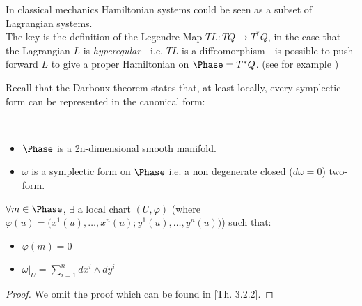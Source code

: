 \documentclass[Main]{subfiles}
\begin{document}
	\begin{observation}
		In classical mechanics Hamiltonian systems could be seen as a subset of Lagrangian systems.
		\\
		The key is the definition of the Legendre Map $TL: TQ \rightarrow T^*Q$,  in the case that the Lagrangian $L$  is \emph{hyperegular}  - i.e. $TL$ is a diffeomorphism - is possible to push-forward $L$ to give a proper Hamiltonian on $\Phase=T^*Q$. (see for example \cite{Abraham1978})
	\end{observation}	
	Recall that the Darboux theorem states that, at least locally, every symplectic form can be represented in the canonical form:
	\begin{theorem}[Darboux]
		$ $
		\begin{hypothesis}
			\begin{itemize}
				\item $\Phase$ is a 2n-dimensional smooth manifold.
				\item $\omega$ is a symplectic form on $\Phase$ i.e. a non degenerate closed ($d \omega =0$) two-form.
			\end{itemize}
		\end{hypothesis}
		\begin{thesis}
			 $\forall m\in \Phase$,  $\exists$ a local chart  $(U,\varphi)$ (where $\varphi(u) = \big(x^1(u), \ldots, x^n(u); y^1(u),\ldots, y^n(u) \big)$) such that:
					\begin{itemize}
						\item $\varphi(m) =0$
						\item	$\omega \big\vert_U = \sum_{i=1}^n dx^i \wedge dy^i$
					\end{itemize}
		\end{thesis}
	\end{theorem}
	\begin{proof}
		We omit the proof which can be found in \cite{Abraham1978}[Th. 3.2.2].
	\end{proof}		
		
\end{document}
